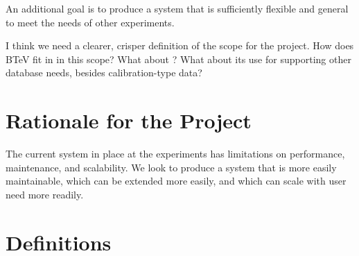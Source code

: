 An additional goal 
is to produce a system 
that is sufficiently flexible and general
to meet the needs
of other experiments.

\begin{fixme}
I think we need a clearer, crisper definition of the scope for
the project. How does BTeV fit in in this scope? What about \DO? What
about its use for supporting other database needs, besides
calibration-type data?
\end{fixme}

\section{Rationale for the Project}

The current system in place at the experiments has limitations on
performance, maintenance, and scalability. We look to produce a system
that is more easily maintainable, which can be extended more easily,
and which can scale with user need more readily.

\section{Definitions}

